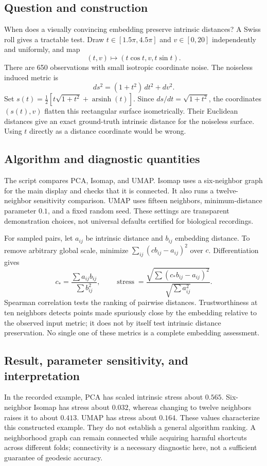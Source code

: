 \subsection{Question and construction}
When does a visually convincing embedding preserve intrinsic distances? A Swiss roll gives a tractable test. Draw $t\in[1.5\pi,4.5\pi]$ and $v\in[0,20]$ independently and uniformly, and map
\begin{equation}
(t,v)\longmapsto(t\cos t,v,t\sin t).
\end{equation}
There are 650 observations with small isotropic coordinate noise. The noiseless induced metric is
\begin{equation}
 ds^2=(1+t^2)\,dt^2+dv^2.
\end{equation}
Set $s(t)=\tfrac12[t\sqrt{1+t^2}+\operatorname{arsinh}(t)]$. Since $ds/dt=\sqrt{1+t^2}$, the coordinates $(s(t),v)$ flatten this rectangular surface isometrically. Their Euclidean distances give an exact ground-truth intrinsic distance for the noiseless surface. Using $t$ directly as a distance coordinate would be wrong.

\subsection{Algorithm and diagnostic quantities}
The script compares PCA, Isomap, and UMAP. Isomap uses a six-neighbor graph for the main display and checks that it is connected. It also runs a twelve-neighbor sensitivity comparison. UMAP uses fifteen neighbors, minimum-distance parameter $0.1$, and a fixed random seed. These settings are transparent demonstration choices, not universal defaults certified for biological recordings.

For sampled pairs, let $a_{ij}$ be intrinsic distance and $b_{ij}$ embedding distance. To remove arbitrary global scale, minimize $\sum_{ij}(c b_{ij}-a_{ij})^2$ over $c$. Differentiation gives
\begin{equation}
 c_* = \frac{\sum a_{ij}b_{ij}}{\sum b_{ij}^2},\qquad
 \operatorname{stress}=\frac{\sqrt{\sum(c_*b_{ij}-a_{ij})^2}}{\sqrt{\sum a_{ij}^2}}.
\end{equation}
Spearman correlation tests the ranking of pairwise distances. Trustworthiness at ten neighbors detects points made spuriously close by the embedding relative to the observed input metric; it does not by itself test intrinsic distance preservation. No single one of these metrics is a complete embedding assessment.

\subsection{Result, parameter sensitivity, and interpretation}
In the recorded example, PCA has scaled intrinsic stress about $0.565$. Six-neighbor Isomap has stress about $0.032$, whereas changing to twelve neighbors raises it to about $0.413$. UMAP has stress about $0.164$. These values characterize this constructed example. They do not establish a general algorithm ranking. A neighborhood graph can remain connected while acquiring harmful shortcuts across different folds; connectivity is a necessary diagnostic here, not a sufficient guarantee of geodesic accuracy.

